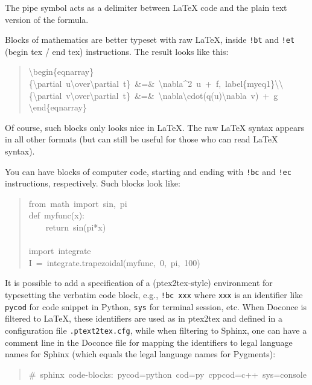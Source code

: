 \documentclass[a4paper,english]{article}
\begin{document}
The pipe symbol acts as a delimiter between LaTeX code and the plain text
version of the formula.

Blocks of mathematics are better typeset with raw LaTeX, inside
\texttt{!bt} and \texttt{!et} (begin tex / end tex) instructions.
The result looks like this:
%
\begin{quote}{\ttfamily \raggedright \noindent
\textbackslash{}begin\{eqnarray\}\\
\{\textbackslash{}partial~u\textbackslash{}over\textbackslash{}partial~t\}~\&=\&~\textbackslash{}nabla\textasciicircum{}2~u~+~f,~label\{myeq1\}\textbackslash{}\textbackslash{}\\
\{\textbackslash{}partial~v\textbackslash{}over\textbackslash{}partial~t\}~\&=\&~\textbackslash{}nabla\textbackslash{}cdot(q(u)\textbackslash{}nabla~v)~+~g\\
\textbackslash{}end\{eqnarray\}
}
\end{quote}

Of course, such blocks only looks nice in LaTeX. The raw
LaTeX syntax appears in all other formats (but can still be useful
for those who can read LaTeX syntax).

You can have blocks of computer code, starting and ending with
\texttt{!bc} and \texttt{!ec} instructions, respectively. Such blocks look like:
%
\begin{quote}{\ttfamily \raggedright \noindent
from~math~import~sin,~pi\\
def~myfunc(x):\\
~~~~return~sin(pi*x)\\
~\\
import~integrate\\
I~=~integrate.trapezoidal(myfunc,~0,~pi,~100)
}
\end{quote}

It is possible to add a specification of a (ptex2tex-style)
environment for typesetting the verbatim code block, e.g., \texttt{!bc xxx}
where \texttt{xxx} is an identifier like \texttt{pycod} for code snippet in Python,
\texttt{sys} for terminal session, etc. When Doconce is filtered to LaTeX,
these identifiers are used as in ptex2tex and defined in a
configuration file \texttt{.ptext2tex.cfg}, while when filtering
to Sphinx, one can have a comment line in the Doconce file for
mapping the identifiers to legal language names for Sphinx (which equals
the legal language names for Pygments):
%
\begin{quote}{\ttfamily \raggedright \noindent
\#~sphinx~code-blocks:~pycod=python~cod=py~cppcod=c++~sys=console
}
\end{quote}
\end{document}
